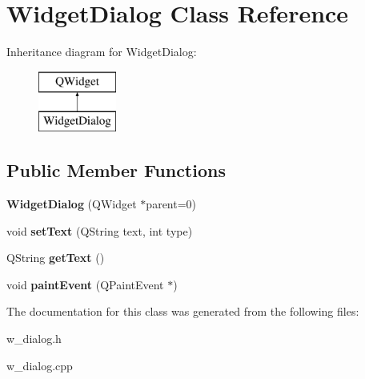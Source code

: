 \hypertarget{class_widget_dialog}{}\section{Widget\+Dialog Class Reference}
\label{class_widget_dialog}
Inheritance diagram for Widget\+Dialog\+:\begin{figure}[H]
\begin{center}
\leavevmode
\includegraphics[height=2.000000cm]{class_widget_dialog}
\end{center}
\end{figure}
\subsection*{Public Member Functions}
\begin{DoxyCompactItemize}
\item 
\hypertarget{class_widget_dialog_aa282c5193c1318f92bd21fe77a3f66bb}{}{\bfseries Widget\+Dialog} (Q\+Widget $\ast$parent=0)\label{class_widget_dialog_aa282c5193c1318f92bd21fe77a3f66bb}

\item 
\hypertarget{class_widget_dialog_ad4ee3d228612e11780f73839db9150a9}{}void {\bfseries set\+Text} (Q\+String text, int type)\label{class_widget_dialog_ad4ee3d228612e11780f73839db9150a9}

\item 
\hypertarget{class_widget_dialog_ab904d7133d4de10e637cc48aac3a3ecc}{}Q\+String {\bfseries get\+Text} ()\label{class_widget_dialog_ab904d7133d4de10e637cc48aac3a3ecc}

\item 
\hypertarget{class_widget_dialog_aa3af6ec9a3e6dc42e82f86a851994614}{}void {\bfseries paint\+Event} (Q\+Paint\+Event $\ast$)\label{class_widget_dialog_aa3af6ec9a3e6dc42e82f86a851994614}

\end{DoxyCompactItemize}


The documentation for this class was generated from the following files\+:\begin{DoxyCompactItemize}
\item 
w\+\_\+dialog.\+h\item 
w\+\_\+dialog.\+cpp\end{DoxyCompactItemize}
